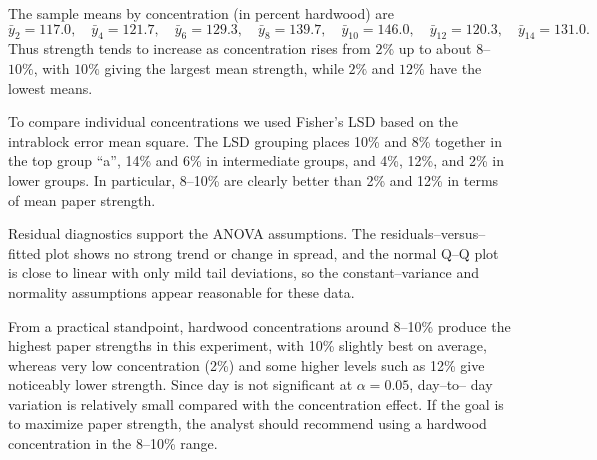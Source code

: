 \documentclass[answers,12pt,addpoints]{exam}
\begin{document}
\begin{questions}
\begin{solution}
The sample means by concentration (in percent hardwood) are
\[
\bar y_{2} = 117.0,\quad
\bar y_{4} = 121.7,\quad
\bar y_{6} = 129.3,\quad
\bar y_{8} = 139.7,\quad
\bar y_{10} = 146.0,\quad
\bar y_{12} = 120.3,\quad
\bar y_{14} = 131.0.
\]
Thus strength tends to increase as concentration rises from $2\%$ up to about
$8$–$10\%$, with $10\%$ giving the largest mean strength, while $2\%$ and $12\%$
have the lowest means.

To compare individual concentrations we used Fisher’s LSD based on the intrablock
error mean square. The LSD grouping places 10\% and 8\% together in the top group
``a'', 14\% and 6\% in intermediate groups, and 4\%, 12\%, and 2\% in lower groups.
In particular, 8–10\% are clearly better than 2\% and 12\% in terms of mean paper
strength.

Residual diagnostics support the ANOVA assumptions. The residuals–versus–fitted
plot shows no strong trend or change in spread, and the normal Q–Q plot is close
to linear with only mild tail deviations, so the constant–variance and normality
assumptions appear reasonable for these data.

From a practical standpoint, hardwood concentrations around 8–10\% produce the
highest paper strengths in this experiment, with 10\% slightly best on average,
whereas very low concentration (2\%) and some higher levels such as 12\% give
noticeably lower strength. Since day is not significant at $\alpha=0.05$, day–to–
day variation is relatively small compared with the concentration effect. If the
goal is to maximize paper strength, the analyst should recommend using a hardwood
concentration in the 8–10\% range.
\end{solution}

\end{questions}
\end{document}
